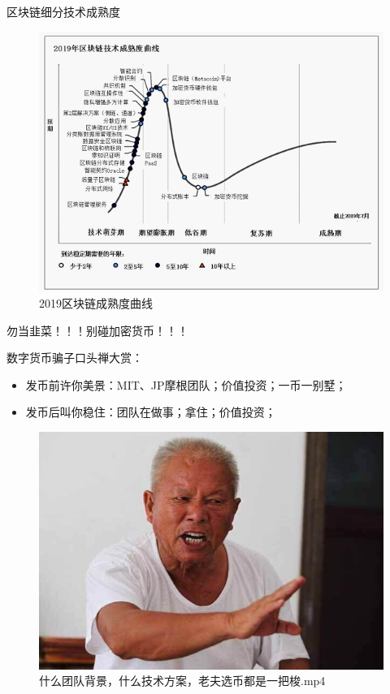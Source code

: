 \documentclass[11pt]{beamer}
\begin{document}
\begin{frame}{区块链细分技术成熟度}
	\begin{figure}
		\centering
		\includegraphics[width=0.8\linewidth]{figures/2019区块链成熟度曲线}
		\caption{2019区块链成熟度曲线}
		\label{fig:2019blockchainpostion}
	\end{figure}
	
\end{frame}

\begin{frame}{勿当韭菜！！！别碰加密货币！！！}
	
	{\color{red}
		数字货币骗子口头禅大赏：
		\begin{itemize}
			\item 发币前许你美景：MIT、JP摩根团队；价值投资；一币一别墅；
			\item 发币后叫你稳住：团队在做事；拿住；价值投资；
		\end{itemize}
	}
	\begin{figure}
		\centering
		\includegraphics[width=0.5\linewidth]{figures/AllInGrandpa}
		\caption{什么团队背景，什么技术方案，老夫选币都是一把梭.mp4}
		\label{fig:allingrandpa}
	\end{figure}
	
\end{frame}
\end{document}
